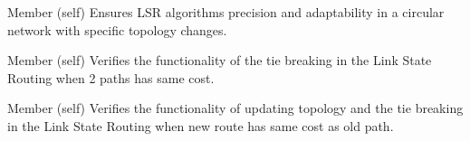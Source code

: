 \begin{DoxyRefList}
\item[Member \doxylink{classtest__lsr_1_1_test_link_state_a3eb6b64ae52ad140471941e20c087593}{test\+\_\+lsr.Test\+Link\+State.test\+\_\+lsr\+\_\+circular} (self)]\label{test__test000018}%
%
Ensures LSR algorithm\textquotesingle{}s precision and adaptability in a circular network with specific topology changes.  
\item[Member \doxylink{classtest__lsr_1_1_test_link_state_ad4c04c827411a720179df65f790399f5}{test\+\_\+lsr.Test\+Link\+State.test\+\_\+tie\+\_\+break} (self)]\label{test__test000013}%
%
Verifies the functionality of the tie breaking in the Link State Routing when 2 paths has same cost.  
\item[Member \doxylink{classtest__lsr_1_1_test_link_state_a15bc630780ccb6445a53d1c58b4b6b9c}{test\+\_\+lsr.Test\+Link\+State.test\+\_\+tie\+\_\+break\+\_\+after\+\_\+changes} (self)]\label{test__test000014}%
%
Verifies the functionality of updating topology and the tie breaking in the Link State Routing when new route has same cost as old path. 
\end{DoxyRefList}